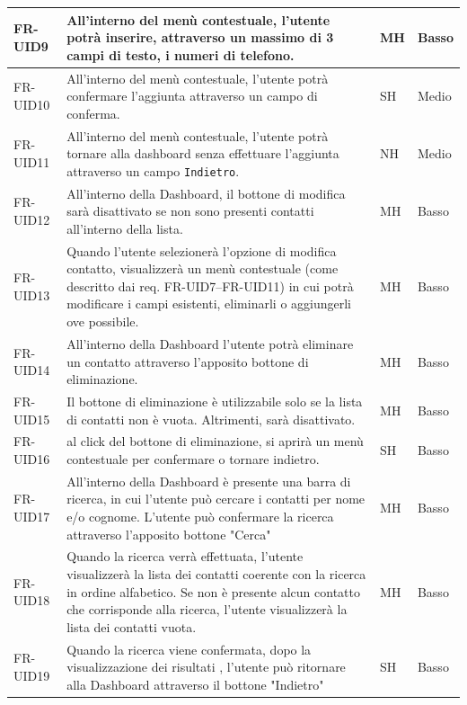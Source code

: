 \documentclass[a4paper,12pt]{article}
\begin{document}
\begin{longtable}{|l|p{8cm}|l|l|}
        \hline
        FR-UID9  & All'interno del menù contestuale, l'utente potrà inserire,
        attraverso un massimo di 3 campi di testo, i numeri di telefono. & MH & Basso \\
        \hline
        FR-UID10 & All'interno del menù contestuale, l'utente potrà confermare
        l'aggiunta attraverso un campo di conferma. & SH & Medio \\
        \hline
        FR-UID11 & All'interno del menù contestuale, l'utente potrà tornare alla dashboard
        senza effettuare l'aggiunta attraverso un campo \texttt{Indietro}. & NH & Medio \\
        \hline
        FR-UID12 & All'interno della Dashboard, il bottone di modifica sarà disattivato
        se non sono presenti contatti all'interno della lista. & MH & Basso \\
        \hline
        FR-UID13 & Quando l'utente selezionerà l'opzione di modifica contatto, visualizzerà
        un menù contestuale (come descritto dai req. FR-UID7--FR-UID11) in cui potrà
        modificare i campi esistenti, eliminarli o aggiungerli ove possibile. & MH & Basso \\
        \hline
        FR-UID14 & All'interno della Dashboard l'utente potrà eliminare un contatto
        attraverso l'apposito bottone di eliminazione. & MH & Basso \\
        \hline
        FR-UID15 & Il bottone di eliminazione è utilizzabile solo se la lista di contatti non è vuota. Altrimenti, sarà disattivato. & MH & Basso \\ \hline
        FR-UID16 & al click del bottone di eliminazione, si aprirà un menù contestuale per confermare o tornare indietro. & SH & Basso \\ \hline
        FR-UID17 & All'interno della Dashboard è presente una barra di ricerca, in cui l'utente può cercare i contatti per nome e/o cognome. L'utente può confermare la ricerca attraverso l'apposito bottone "Cerca" & MH & Basso \\ \hline
        FR-UID18 & Quando la ricerca verrà effettuata, l'utente visualizzerà la lista dei contatti coerente con la ricerca in ordine alfabetico. Se non è presente alcun contatto che corrisponde alla ricerca, l'utente visualizzerà la lista dei contatti vuota. & MH & Basso \\ \hline
        FR-UID19 & Quando la ricerca viene confermata, dopo la visualizzazione dei risultati , l'utente può ritornare alla Dashboard attraverso il bottone "Indietro" & SH & Basso \\ \hline

\end{longtable}
\end{document}
